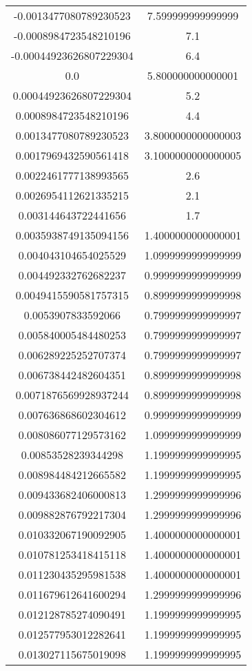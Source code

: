 \begin{table}
\begin{tabular}{S[]S[]}
-0.0013477080789230523 & 7.599999999999999\\
-0.0008984723548210196 & 7.1\\
-0.00044923626807229304 & 6.4\\
0.0 & 5.800000000000001\\
0.00044923626807229304 & 5.2\\
0.0008984723548210196 & 4.4\\
0.0013477080789230523 & 3.8000000000000003\\
0.0017969432590561418 & 3.1000000000000005\\
0.0022461777138993565 & 2.6\\
0.0026954112621335215 & 2.1\\
0.003144643722441656 & 1.7\\
0.0035938749135094156 & 1.4000000000000001\\
0.004043104654025529 & 1.0999999999999999\\
0.004492332762682237 & 0.9999999999999999\\
0.0049415590581757315 & 0.8999999999999998\\
0.0053907833592066 & 0.7999999999999997\\
0.005840005484480253 & 0.7999999999999997\\
0.006289225252707374 & 0.7999999999999997\\
0.006738442482604351 & 0.8999999999999998\\
0.0071876569928937244 & 0.8999999999999998\\
0.007636868602304612 & 0.9999999999999999\\
0.008086077129573162 & 1.0999999999999999\\
0.00853528239344298 & 1.1999999999999995\\
0.008984484212665582 & 1.1999999999999995\\
0.009433682406000813 & 1.2999999999999996\\
0.009882876792217304 & 1.2999999999999996\\
0.010332067190092905 & 1.4000000000000001\\
0.010781253418415118 & 1.4000000000000001\\
0.011230435295981538 & 1.4000000000000001\\
0.011679612641600294 & 1.2999999999999996\\
0.012128785274090491 & 1.1999999999999995\\
0.012577953012282641 & 1.1999999999999995\\
0.013027115675019098 & 1.1999999999999995\\
\bottomrule
\end{tabular}\end{table}
